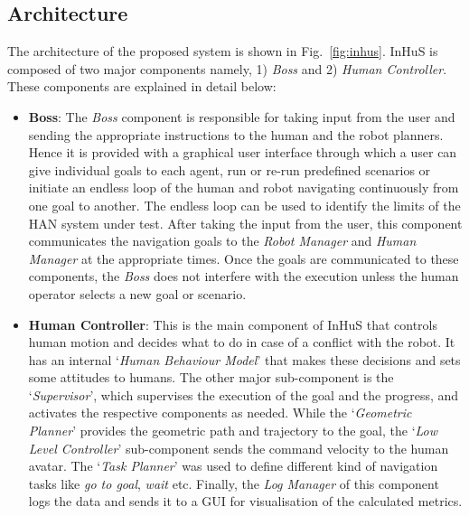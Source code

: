 \subsection{Architecture}
The architecture of the proposed system is shown in Fig.~\ref{fig:inhus}. InHuS is composed of two major components namely, 1) \textit{Boss} and 2) \textit{Human Controller}. These components are explained in detail below:
\begin{itemize}[label={}]
    \item \textbf{Boss}: The \textit{Boss} component is responsible for taking input from the user and sending the appropriate instructions to the human and the robot planners. Hence it is provided with a graphical user interface through which a user can give individual goals to each agent, run or re-run predefined scenarios or initiate an endless loop of the human and robot navigating continuously from one goal to another. The endless loop can be used to identify the limits of the HAN system under test. After taking the input from the user, this component communicates the navigation goals to the \textit{Robot Manager} and \textit{Human Manager} at the appropriate times. Once the goals are communicated to these components, the \textit{Boss} does not interfere with the execution unless the human operator selects a new goal or scenario.
    \item \textbf{Human Controller}: This is the main component of InHuS that controls human motion and decides what to do in case of a conflict with the robot. It has an internal `\textit{Human Behaviour Model}' that makes these decisions and sets some attitudes to humans. The other major sub-component is the `\textit{Supervisor}', which supervises the execution of the goal and the progress, and activates the respective components as needed. While the `\textit{Geometric Planner}' provides the geometric path and trajectory to the goal, the `\textit{Low Level Controller}' sub-component sends the command velocity to the human avatar. The `\textit{Task Planner}' was used to define different kind of navigation tasks like \textit{go to goal}, \textit{wait} etc. Finally, the \textit{Log Manager} of this component logs the data and sends it to a GUI for visualisation of the calculated metrics.
\end{itemize}

